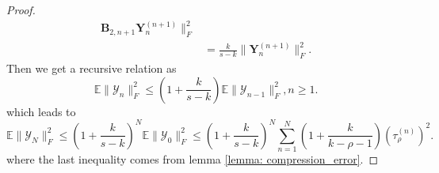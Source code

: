 \begin{lem}
\begin{proof}
\begin{equation}
\begin{aligned}
\mathbf{B}_{2,n+1}\mathbf{Y}_n^{(n+1)}\|_F^2\\
& = \frac{k}{s-k}\|\mathbf{Y}_n^{(n+1)}\|_F^2.
\end{aligned}
\end{equation}
Then we get a recursive relation as 
\begin{equation}
\mathbb{E}\|\mathscr{Y}_{n}\|_F^2 \le  \left(1+\frac{k}{s-k}\right) \mathbb{E}\|\mathscr{Y}_{n-1}\|_F^2, n\ge 1.
\end{equation}
which leads to 
\begin{equation}
\mathbb{E}\|\mathscr{Y}_{N}\|_F^2 \le  \left(1+\frac{k}{s-k}\right)^N  \mathbb{E}\|\mathscr{Y}_0\|_F^2 \le  \left(1+\frac{k}{s-k}\right)^N  \sum_{n=1}^N \left(1+\frac{k}{k-\rho-1}\right)(\tau^{(n)}_\rho)^2. 
\end{equation}
where the last inequality comes from lemma \ref{lemma: compression_error}. 
\end{proof}
\end{lem}
\fi